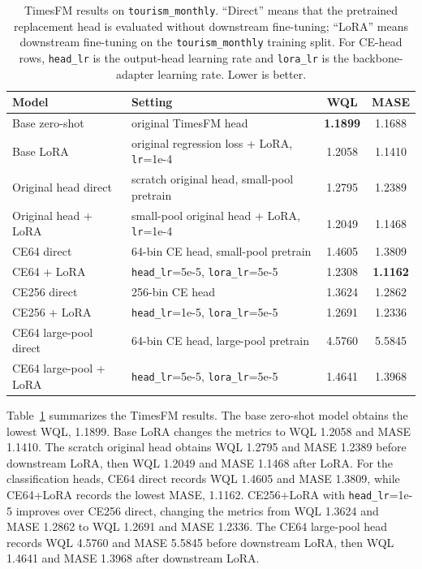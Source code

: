 \documentclass{article}
\begin{document}
\begin{table}[H]
    \centering
    \caption{TimesFM results on \texttt{tourism\_monthly}.  ``Direct'' means
    that the pretrained replacement head is evaluated without downstream
    fine-tuning; ``LoRA'' means downstream fine-tuning on the
    \texttt{tourism\_monthly} training split.  For CE-head rows,
    \texttt{head\_lr} is the output-head learning rate and \texttt{lora\_lr} is
    the backbone-adapter learning rate.  Lower is better.}
    \label{tab:timesfm-results}
    \scriptsize
    \begin{tabular}{p{}p{}cc}
        \toprule
        Model & Setting & WQL & MASE \\
        \midrule
        Base zero-shot & original TimesFM head & \textbf{1.1899} & 1.1688 \\
        Base LoRA & original regression loss + LoRA, \texttt{lr}=1e-4 &
        1.2058 & 1.1410 \\
        Original head direct & scratch original head, small-pool pretrain &
        1.2795 & 1.2389 \\
        Original head + LoRA & small-pool original head + LoRA, \texttt{lr}=1e-4 &
        1.2049 & 1.1468 \\
        \midrule
        CE64 direct & 64-bin CE head, small-pool pretrain &
        1.4605 & 1.3809 \\
        CE64 + LoRA & \texttt{head\_lr}=5e-5, \texttt{lora\_lr}=5e-5 &
        1.2308 & \textbf{1.1162} \\
        \midrule
        CE256 direct & 256-bin CE head &
        1.3624 & 1.2862 \\
        CE256 + LoRA & \texttt{head\_lr}=1e-5, \texttt{lora\_lr}=5e-5 &
        1.2691 & 1.2336 \\
        \midrule
        CE64 large-pool direct & 64-bin CE head, large-pool pretrain &
        4.5760 & 5.5845 \\
        CE64 large-pool + LoRA & \texttt{head\_lr}=5e-5, \texttt{lora\_lr}=5e-5 &
        1.4641 & 1.3968 \\
        \bottomrule
    \end{tabular}
\end{table}

Table~\ref{tab:timesfm-results} summarizes the TimesFM results.  The base
zero-shot model obtains the lowest WQL, 1.1899.  Base LoRA changes the metrics
to WQL 1.2058 and MASE 1.1410.  The scratch original head obtains WQL 1.2795 and
MASE 1.2389 before downstream LoRA, then WQL 1.2049 and MASE 1.1468 after LoRA.
For the classification heads, CE64 direct records WQL 1.4605 and MASE 1.3809,
while CE64+LoRA records the lowest MASE, 1.1162.  CE256+LoRA with
\texttt{head\_lr}=1e-5 improves over CE256 direct, changing the metrics from
WQL 1.3624 and MASE 1.2862 to WQL 1.2691 and MASE 1.2336.  The CE64 large-pool
head records WQL 4.5760 and MASE 5.5845 before downstream LoRA, then WQL 1.4641
and MASE 1.3968 after downstream LoRA.
\end{document}
